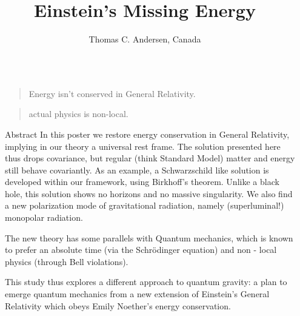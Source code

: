 \documentclass[final]{beamer}
\title{Einstein's Missing Energy}
\author{\small Thomas C. Andersen, Canada}
\newlength{\sepwidth}
\newlength{\colwidth}
\newcommand{\separatorcolumn}{\begin{column}{\sepwidth}\end{column}}
\begin{document}

\begin{frame}[t]
\begin{columns}[t]
\separatorcolumn


\begin{column}{\colwidth}
\begin{quotation}
Energy isn't conserved in General Relativity.
\end{quotation}

\begin{quotation}
actual physics is non-local.
\end{quotation}



  \begin{block}{Abstract}
In this poster we restore energy conservation in General Relativity, implying in our theory a universal rest frame. The solution presented here thus drops covariance, but regular (think Standard Model) matter and energy still behave covariantly. As an example, a Schwarzschild like solution is developed within our framework, using Birkhoff's theorem. Unlike a black hole, this solution shows no horizons and no massive singularity. We also find a new polarization mode of gravitational radiation, namely (superluminal!) monopolar radiation.

The new theory has some parallels with Quantum mechanics, which is known to prefer an absolute time (via the Schrödinger equation) and non - local physics (through Bell violations).

This study thus explores a different approach to quantum gravity: a plan to emerge quantum mechanics from a new extension of Einstein's General Relativity which obeys Emily Noether's energy conservation. 


\end{block}
\end{column}
\end{columns}
\end{frame}
\end{document}
